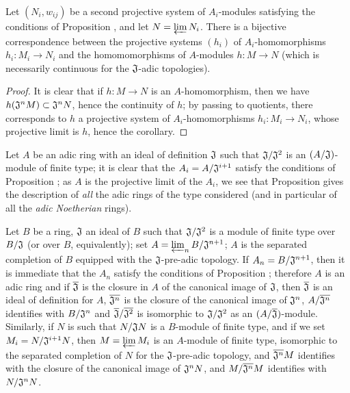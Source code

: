 \begin{cor}[7.2.10]
\label{0.7.2.10}
Let $(N_i,w_{ij})$ be a second projective system of $A_i$-modules satisfying the conditions
of Proposition , and let $N=\varprojlim N_i$. There is a
bijective correspondence between the projective systems $(h_i)$ of $A_i$-homomorphisms
$h_i:M_i\to N_i$ and the homomomorphisms of $A$-modules $h:M\to N$ (which is necessarily
continuous for the $\mathfrak{J}$-adic topologies).
\end{cor}

\begin{proof}
\label{proof-0.7.2.10}
It is clear that if $h:M\to N$ is an $A$-homomorphism, then we have
$h(\mathfrak{J}^n M)\subset\mathfrak{J}^n N$, hence the continuity of $h$; by passing to
quotients, there corresponds to $h$ a projective system of $A_i$-homomorphisms
$h_i:M_i\to N_i$, whose projective limit is $h$, hence the corollary.
\end{proof}

\begin{rmk}[7.2.11]
\label{0.7.2.11}
Let $A$ be an adic ring with an ideal of definition $\mathfrak{J}$ such that
$\mathfrak{J}/\mathfrak{J}^2$ is an $(A/\mathfrak{J})$-module of finite type; it is clear
that the $A_i=A/\mathfrak{J}^{i+1}$ satisfy
the conditions of Proposition ; as $A$ is the projective
limit of the $A_i$, we see that Proposition  gives the
description of \emph{all} the adic rings of the type considered (and in particular of all
the \emph{adic Noetherian} rings).
\end{rmk}

\begin{exm}[7.2.12]
\label{0.7.2.12}
Let $B$ be a ring, $\mathfrak{J}$ an ideal of $B$ such that $\mathfrak{J}/\mathfrak{J}^2$ is
a module of finite type over $B/\mathfrak{J}$ (or over $B$, equivalently); set
$A=\varprojlim_n B/\mathfrak{J}^{n+1}$; $A$ is the separated completion of $B$ equipped with
the $\mathfrak{J}$-pre-adic topology. If $A_n=B/\mathfrak{J}^{n+1}$, then it is immediate
that the $A_n$ satisfy the conditions of Proposition ;
therefore $A$ is an adic ring and if $\overline{\mathfrak{J}}$ is the closure in $A$ of the
canonical image of $\mathfrak{J}$, then $\overline{\mathfrak{J}}$ is an ideal of definition
for $A$, $\overline{\mathfrak{J}^n}$ is the closure of the canonical image of
$\mathfrak{J}^n$, $A/\overline{\mathfrak{J}^n}$ identifies with $B/\mathfrak{J}^n$ and
$\overline{\mathfrak{J}}/\overline{\mathfrak{J}^2}$ is isomorphic to
$\mathfrak{J}/\mathfrak{J}^2$ as an $(A/\overline{\mathfrak{J}})$-module. Similarly, if $N$
is such that $N/\mathfrak{J}N$ is a $B$-module of finite type, and if we set
$M_i=N/\mathfrak{J}^{i+1}N$, then $M=\varprojlim M_i$ is an $A$-module of finite type,
isomorphic to the separated completion of $N$ for the $\mathfrak{J}$-pre-adic topology, and
$\overline{\mathfrak{J}^n}M$ identifies with the closure of the canonical image of
$\mathfrak{J}^n N$, and $M/\overline{\mathfrak{J}^n}M$ identifies with
$N/\mathfrak{J}^n N$.
\end{exm}

